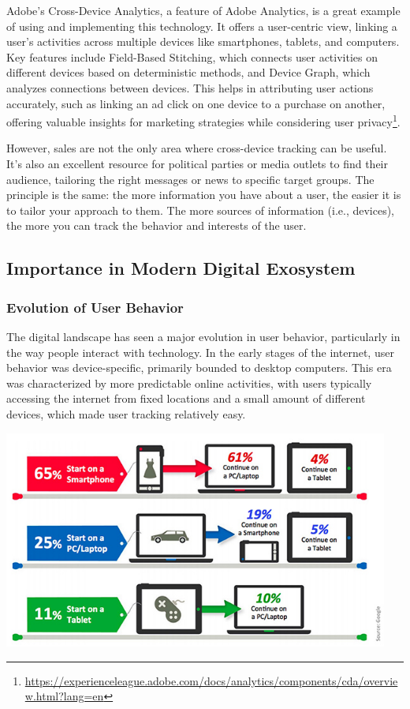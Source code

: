 Adobe's Cross-Device Analytics, a feature of Adobe Analytics, is a great example of using and implementing this technology. It offers a user-centric view, linking a user's activities across multiple devices like smartphones, tablets, and computers. Key features include Field-Based Stitching, which connects user activities on different devices based on deterministic methods, and Device Graph, which analyzes connections between devices. This helps in attributing user actions accurately, such as linking an ad click on one device to a purchase on another, offering valuable insights for marketing strategies while considering user privacy\footnote{\href{https://experienceleague.adobe.com/docs/analytics/components/cda/overview.html?lang=en}{https://experienceleague.adobe.com/docs/analytics/components/cda/overview.html?lang=en}}.

However, sales are not the only area where cross-device tracking can be useful. It's also an excellent resource for political parties or media outlets to find their audience, tailoring the right messages or news to specific target groups. The principle is the same: the more information you have about a user, the easier it is to tailor your approach to them. The more sources of information (i.e., devices), the more you can track the behavior and interests of the user.
\subsection{Importance in Modern Digital Exosystem}

\subsubsection{Evolution of User Behavior}
The digital landscape has seen a major evolution in user behavior, particularly in the way people interact with technology. In the early stages of the internet, user behavior was device-specific, primarily bounded to desktop computers. This era was characterized by more predictable online activities, with users typically accessing the internet from fixed locations and a small amount of different devices, which made user tracking relatively easy.

\vspace{0.8cm}
\includegraphics[width=0.95\textwidth]{./assets/google-cdt-stats.jpeg}
\vspace{0.8cm}

